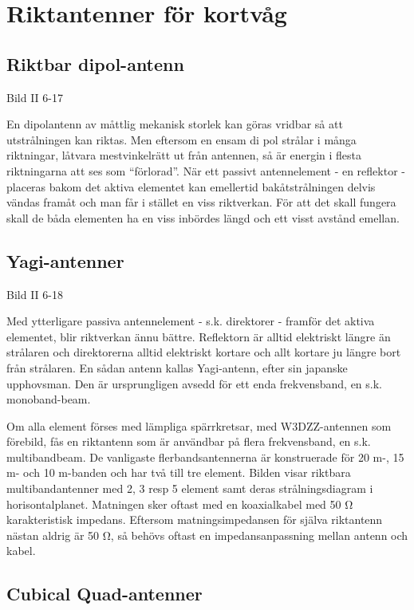 \section{Riktantenner för kortvåg}

\subsection{Riktbar dipol-antenn}

Bild II 6-17

En dipolantenn av måttlig mekanisk storlek kan göras vridbar så att
utstrålningen kan riktas. Men eftersom en ensam di pol strålar i många
riktningar, låtvara mestvinkelrätt ut från antennen, så är energin i
flesta riktningarna att ses som ``förlorad''. När ett passivt
antennelement - en reflektor - placeras bakom det aktiva elementet kan
emellertid bakåtstrålningen delvis vändas framåt och man får i stället
en viss riktverkan. För att det skall fungera skall de båda elementen
ha en viss inbördes längd och ett visst avstånd emellan.


\subsection{Yagi-antenner}

Bild II 6-18

Med ytterligare passiva antennelement - s.k. direktorer - framför det
aktiva elementet, blir riktverkan ännu bättre. Reflektorn är alltid
elektriskt längre än strålaren och direktorerna alltid elektriskt
kortare och allt kortare ju längre bort från strålaren. En sådan
antenn kallas Yagi-antenn, efter sin japanske upphovsman. Den är
ursprungligen avsedd för ett enda frekvensband, en s.k. monoband-beam.

Om alla element förses med lämpliga spärrkretsar, med W3DZZ-antennen
som förebild, fås en riktantenn som är användbar på flera
frekvensband, en s.k. multibandbeam. De vanligaste flerbandsantennerna
är konstruerade för 20 m-, 15 m- och 10 m-banden och har två till tre
element.  Bilden visar riktbara multibandantenner med 2, 3 resp 5
element samt deras strålningsdiagram i horisontalplanet.  Matningen
sker oftast med en koaxialkabel med 50 Ω karakteristisk
impedans. Eftersom matningsimpedansen för själva riktantenn nästan
aldrig är 50 Ω, så behövs oftast en impedansanpassning mellan antenn
och kabel.

\subsection{Cubical Quad-antenner}

